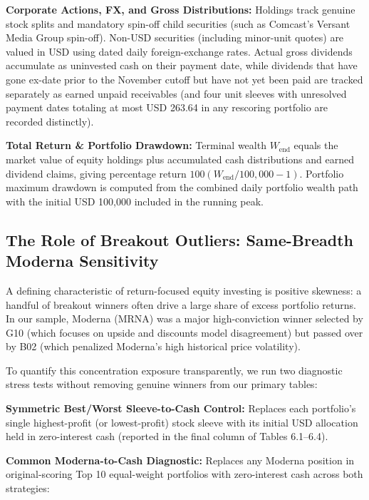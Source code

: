 \documentclass[11pt,a4paper]{article}
\numberwithin{table}{section}
\begin{document}
\textbf{Corporate Actions, FX, and Gross Distributions:}  Holdings track genuine stock splits and mandatory spin-off child securities (such as Comcast's Versant Media Group spin-off). Non-USD securities (including minor-unit quotes) are valued in USD using dated daily foreign-exchange rates. Actual gross dividends accumulate as uninvested cash on their payment date, while dividends that have gone ex-date prior to the November cutoff but have not yet been paid are tracked separately as earned unpaid receivables (and four unit sleeves with unresolved payment dates totaling at most USD 263.64 in any rescoring portfolio are recorded distinctly).

\textbf{Total Return \& Portfolio Drawdown:}  Terminal wealth $W_{\text{end}}$ equals the market value of equity holdings plus accumulated cash distributions and earned dividend claims, giving percentage return $100(W_{\text{end}} / 100,000 - 1)$. Portfolio maximum drawdown is computed from the combined daily portfolio wealth path with the initial USD 100,000 included in the running peak.

\subsection{The Role of Breakout Outliers: Same-Breadth Moderna Sensitivity}

A defining characteristic of return-focused equity investing is positive skewness: a handful of breakout winners often drive a large share of excess portfolio returns. In our sample, Moderna (MRNA) was a major high-conviction winner selected by G10 (which focuses on upside and discounts model disagreement) but passed over by B02 (which penalized Moderna's high historical price volatility).

To quantify this concentration exposure transparently, we run two diagnostic stress tests without removing genuine winners from our primary tables:

\textbf{Symmetric Best/Worst Sleeve-to-Cash Control:}  Replaces each portfolio's single highest-profit (or lowest-profit) stock sleeve with its initial USD allocation held in zero-interest cash (reported in the final column of Tables 6.1--6.4).

\textbf{Common Moderna-to-Cash Diagnostic:}  Replaces any Moderna position in original-scoring Top 10 equal-weight portfolios with zero-interest cash across both strategies:
\end{document}
